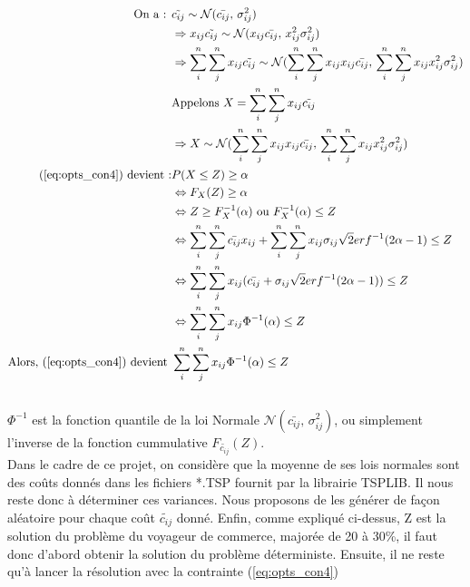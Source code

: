 \documentclass{article}
\begin{document}
\begin{equation}
\begin{aligned}
\textrm{On a : } 
& \tilde{c_{ij}} \sim \mathcal{N}(\bar{c_{ij}},\,\sigma_{ij}^{2})\\
&\Rightarrow x_{ij}\tilde{c_{ij}} \sim \mathcal{N}(x_{ij}\bar{c_{ij}},\, x_{ij}^2\sigma_{ij}^{2})\\
&\Rightarrow \sum_{i}^n \sum_{j}^n x_{ij}\tilde{c_{ij}} \sim \mathcal{N}(\sum_{i}^n \sum_{j}^n x_{ij} x_{ij}\bar{c_{ij}},\, \sum_{i}^n \sum_{j}^n x_{ij} x_{ij}^2\sigma_{ij}^{2})\\
&\textrm{Appelons } X = \sum_{i}^n \sum_{j}^n x_{ij}\tilde{c_{ij}}\\ 
&\Rightarrow X \sim \mathcal{N}(\sum_{i}^n \sum_{j}^n x_{ij} x_{ij}\bar{c_{ij}},\, \sum_{i}^n \sum_{j}^n x_{ij} x_{ij}^2\sigma_{ij}^{2})\\
\textrm{(\ref{eq:opts_con4}) devient :} 
& P(X \leq Z) \geq \alpha \\
&\Leftrightarrow F_X(Z) \geq \alpha\\
&\Leftrightarrow Z \geq F_X^{-1}(\alpha) \textrm{ ou } F_X^{-1}(\alpha) \leq Z\\
&\Leftrightarrow \sum_i^n \sum_j^n \bar{c_{ij}} x_{ij} + \sum_i^n \sum_j^n x_{ij} \sigma_{ij} \sqrt{2}erf^{-1}(2\alpha - 1) \leq Z\\
&\Leftrightarrow \sum_i^n \sum_j^n x_{ij}  (\bar{c_{ij}}  + \sigma_{ij} \sqrt{2}erf^{-1}(2\alpha - 1)) \leq Z\\
&\Leftrightarrow \sum_i^n \sum_j^n x_{ij} \Phi^{-1}(\alpha) \leq Z \\
\textrm{Alors, (\ref{eq:opts_con4}) devient } & \sum_i^n \sum_j^n x_{ij} \Phi^{-1}(\alpha) \leq Z \label{eq:opts_con4q}\\
\end{aligned}
\end{equation}\\
\(\Phi^{-1}\) est la fonction quantile de la loi Normale \(\mathcal{N}(\bar{c_{ij}},\,\sigma_{ij}^{2})\), ou simplement l'inverse de la fonction cummulative \(F_{\tilde{c_{ij}}}(Z)\).\\
Dans le cadre de ce projet, on considère que la moyenne de ses lois normales sont des coûts donnés dans les fichiers *.TSP fournit par la librairie TSPLIB. Il nous reste donc à déterminer ces variances. Nous proposons de les générer de façon aléatoire pour chaque coût \(\tilde{c_{ij}}\) donné.
Enfin, comme expliqué ci-dessus, Z est la solution du problème du voyageur de commerce, majorée de 20 à 30\%, il faut donc d'abord obtenir la solution du problème déterministe. Ensuite, il ne reste qu'à lancer la résolution avec la contrainte (\ref{eq:opts_con4})
\end{document}
